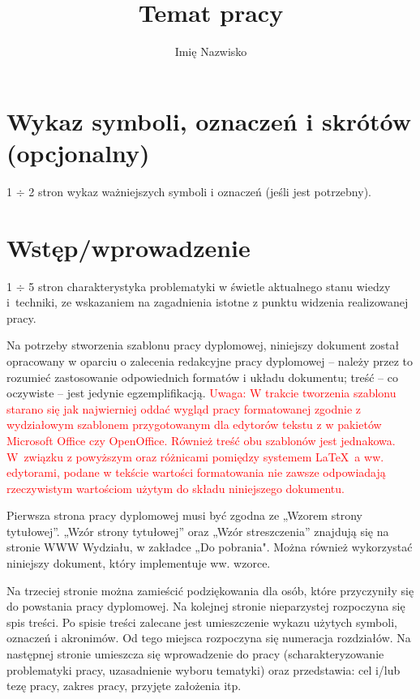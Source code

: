 \documentclass[12pt,twoside]{mwart}
\author{Imię Nazwisko}
\title{Temat pracy}
\begin{document}
\maketitle

\blankpage

\tableofcontents

\clearpage
\blankpage


\section*{Wykaz symboli, oznaczeń i skrótów (opcjonalny)}
%

1 $\div$ 2 stron wykaz ważniejszych symboli i oznaczeń (jeśli jest potrzebny).
\clearpage

\section{Wstęp/wprowadzenie}

1 $\div$ 5 stron charakterystyka problematyki w świetle aktualnego stanu wiedzy i~techniki, ze wskazaniem na zagadnienia istotne z punktu widzenia realizowanej pracy.

Na potrzeby stworzenia szablonu pracy dyplomowej, niniejszy dokument został opracowany w oparciu o zalecenia redakcyjne pracy dyplomowej -- należy przez to rozumieć zastosowanie odpowiednich formatów i układu dokumentu; treść -- co oczywiste -- jest jedynie egzemplifikacją. 
\textcolor{red}{
Uwaga: 
W trakcie tworzenia szablonu starano się jak najwierniej oddać wygląd pracy formatowanej zgodnie z wydziałowym szablonem przygotowanym dla edytorów tekstu z w pakietów Microsoft Office czy OpenOffice. Również treść obu szablonów jest jednakowa. W~związku z powyższym oraz różnicami pomiędzy systemem \LaTeX \ a ww. edytorami, podane w tekście wartości formatowania nie zawsze odpowiadają rzeczywistym wartościom użytym do składu niniejszego dokumentu.
}

Pierwsza strona pracy dyplomowej musi być zgodna ze „Wzorem strony tytułowej”. „Wzór strony tytułowej” oraz „Wzór streszczenia” znajdują się na stronie WWW Wydziału, w zakładce „Do pobrania". Można również wykorzystać niniejszy dokument, który implementuje ww. wzorce.

Na trzeciej stronie można zamieścić podziękowania dla osób, które przyczyniły się do powstania pracy dyplomowej. Na kolejnej stronie nieparzystej rozpoczyna się spis treści. Po spisie treści zalecane jest umieszczenie wykazu użytych symboli, oznaczeń i akronimów. Od tego miejsca rozpoczyna się numeracja rozdziałów. Na następnej stronie umieszcza się wprowadzenie do pracy (scharakteryzowanie problematyki pracy, uzasadnienie wyboru tematyki) oraz przedstawia: cel i/lub tezę pracy, zakres pracy, przyjęte założenia itp.
\end{document}
